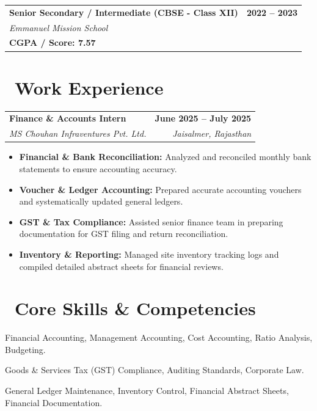 \documentclass[a4paper,10pt]{article}
\begin{document}
\vspace{3pt}

\begin{tabularx}{\textwidth}{@{}X r@{}}
    \textbf{\color{primary} Senior Secondary / Intermediate (CBSE - Class XII)} & \textbf{2022 -- 2023} \\
    \textit{Emmanuel Mission School} & \\
    \textbf{CGPA / Score: 7.57} & \\
\end{tabularx}

\section*{\faBriefcase \ Work Experience}

\begin{tabularx}{\textwidth}{@{}X r@{}}
    \textbf{\color{primary} Finance \& Accounts Intern} & \textbf{June 2025 -- July 2025} \\
    \textit{MS Chouhan Infraventures Pvt. Ltd.} & \textit{Jaisalmer, Rajasthan} \\
\end{tabularx}

\begin{itemize}
    \item \textbf{Financial \& Bank Reconciliation:} Analyzed and reconciled monthly bank statements to ensure accounting accuracy.
    \item \textbf{Voucher \& Ledger Accounting:} Prepared accurate accounting vouchers and systematically updated general ledgers.
    \item \textbf{GST \& Tax Compliance:} Assisted senior finance team in preparing documentation for GST filing and return reconciliation.
    \item \textbf{Inventory \& Reporting:} Managed site inventory tracking logs and compiled detailed abstract sheets for financial reviews.
\end{itemize}

\section*{\faTools \ Core Skills \& Competencies}

\begin{description}[font=\color{primary}\bfseries, leftmargin=0pt, itemsep=2.5pt]
    \item[Accounting \& Finance:] Financial Accounting, Management Accounting, Cost Accounting, Ratio Analysis, Budgeting.
    \item[Taxation \& Compliance:] Goods \& Services Tax (GST) Compliance, Auditing Standards, Corporate Law.
    \item[Business Operations:] General Ledger Maintenance, Inventory Control, Financial Abstract Sheets, Financial Documentation.
\end{description}
\end{document}
